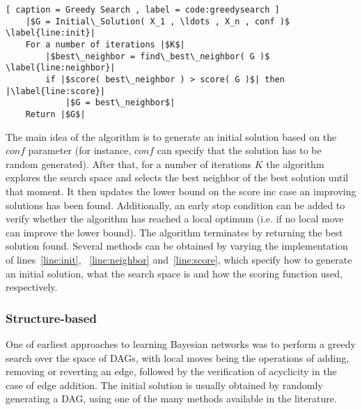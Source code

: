 \begin{lstlisting}[ caption = Greedy Search , label = code:greedysearch ]
	|$G = Initial\_Solution( X_1 , \ldots , X_n , conf )$ \label{line:init}|
	For a number of iterations |$K$|
		|$best\_neighbor = find\_best\_neighbor( G )$ \label{line:neighbor}|
		if |$score( best\_neighbor ) > score( G )$| then |\label{line:score}|
			|$G = best\_neighbor$|
	Return |$G$|
\end{lstlisting}
The main idea of the algorithm is to generate an initial solution based on the ${conf}$ parameter (for instance, ${conf}$ can specify that the solution has to be random generated). After that, for a number of iterations $K$ the algorithm explores the search space and selects the best neighbor of the best solution until that moment. It then updates the lower bound on the score inc case an improving solutions has been found. Additionally, an early stop condition can be added to verify whether the algorithm has reached a local optimum (i.e. if no local move can improve the lower bound). The algorithm terminates by returning the best solution found.
Several methods can be obtained by varying the implementation of lines~\ref{line:init}, ~\ref{line:neighbor} and~\ref{line:score}, which specify how to generate an initial solution, what the search space is and how the scoring function used, respectively. 
\subsubsection{Structure-based}
\label{subsub:structurebased}

One of earliest approaches to learning Bayesian networks was to perform
a greedy search over the space of DAGs, with local moves being the
operations of adding, removing or reverting an edge, followed by the
verification of acyclicity in the case of edge addition. The initial
solution is usually obtained by randomly generating a DAG, using one of
the many methods available in the literature. 


